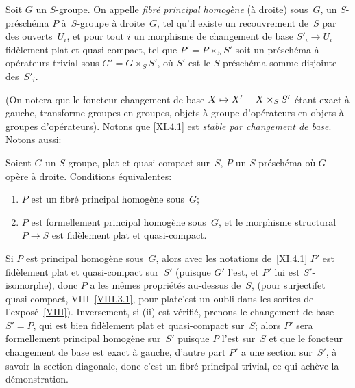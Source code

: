 \begin{definition}
\label{XI.4.1}
Soit $G$ un $S$-groupe. On appelle \emph{fibré principal
homogène} (\`a droite) sous~$G$, un $S$-pr\'esch\'ema $P$
\`a~$S$-groupe \`a droite~$G$, tel qu'il existe un recouvrement de~$S$ par des ouverts~$U_i$, et pour tout $i$ un morphisme de changement
de base $S'_i\to U_i$ fid\`element plat et quasi-compact, tel que
$P'=P\times_S S'$ soit un pr\'esch\'ema \`a op\'erateurs
trivial sous $G'=G\times_S S'$, o\`u $S'$ est le
$S$-pr\'esch\'ema somme disjointe des~$S'_i$.
\end{definition}

(On
notera que le foncteur changement de base $X\mto X'=X\times_S
S'$
\'etant exact \`a gauche, transforme groupes en groupes, objets
\`a groupe d'op\'erateurs en objets \`a groupes
d'op\'erateurs). Notons que \ref{XI.4.1} est \emph{stable par
changement de base}. Notons aussi:

\begin{proposition}
\label{XI.4.2}
Soient $G$ un $S$-groupe, plat et quasi-compact sur~$S$, $P$ un
$S$-pr\'esch\'ema o\`u $G$ op\`ere \`a droite. Conditions
\'equivalentes:
\begin{enumerate}
\item[(i)] $P$ est un fibr\'e principal homog\`ene
sous~$G$;
\item[(ii)] $P$ est formellement principal homog\`ene sous~$G$,
et le morphisme structural $P\to S$ est fid\`element plat et
quasi-compact.
\end{enumerate}
\end{proposition}

Si $P$ est principal homog\`ene sous~$G$, alors avec les notations
de~\ref{XI.4.1} $P'$ est fid\`element plat et quasi-compact sur~$S'$
(puisque $G'$ l'est, et $P'$ lui est $S'$-isomorphe), donc $P$ a les
m\^emes propri\'et\'es au-dessus de~$S$, (pour \og surjectif\fg et
\og quasi-compact\fg, \cf VIII~\ref{VIII.3.1}, pour \og plat\fg c'est un
oubli dans les sorites de l'expos\'e~\ref{VIII}). Inversement, si
(ii) est v\'erifi\'e, prenons le changement de base $S'=P$, qui
est bien fid\`element plat et quasi-compact sur~$S$; alors $P'$ sera
formellement principal homog\`ene sur~$S'$ puisque $P$ l'est sur~$S$
et que le foncteur changement de base est exact \`a gauche, d'autre
part $P'$ a une section sur~$S'$,
\`a savoir
la section diagonale, donc
c'est un fibr\'e principal trivial, ce qui ach\`eve la
d\'emonstration.


